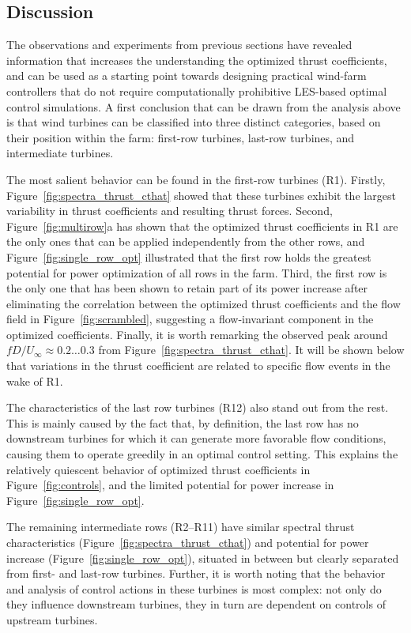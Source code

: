 	\subsection{Discussion}\label{sec:analysis_discussion}
	
	The observations and experiments from previous sections have revealed information that increases the understanding the optimized thrust coefficients, and can be used as a starting point towards designing practical wind-farm controllers that do not require computationally prohibitive LES-based optimal control simulations. A first conclusion that can be drawn from the analysis above is that wind turbines can be classified into three distinct categories, based on their position within the farm: first-row turbines, last-row turbines, and intermediate turbines.
	
	The most salient behavior can be found in the first-row turbines (R1). Firstly, Figure~\ref{fig:spectra_thrust_cthat} showed that these turbines exhibit the largest variability in thrust coefficients and resulting thrust forces. Second, Figure~\ref{fig:multirow}a has shown that the optimized thrust coefficients in R1 are the only ones that can be applied independently from the other rows, and Figure~\ref{fig:single_row_opt} illustrated that the first row holds the greatest potential for power optimization of all rows in the farm. Third, the first row is the only one that has been shown to retain part of its power increase after eliminating the correlation between the optimized thrust coefficients and the flow field in Figure~\ref{fig:scrambled}, suggesting a flow-invariant component in the optimized coefficients. Finally, it is worth remarking the observed peak around $fD/U_\infty \approx 0.2 \dots 0.3$ from Figure~\ref{fig:spectra_thrust_cthat}. It will be shown below that variations in the thrust coefficient are related to specific flow events in the wake of R1.
	
	The characteristics of the last row turbines (R12) also stand out from the rest. This is mainly caused by the fact that, by definition, the last row has no downstream turbines for which it can generate more favorable flow conditions, causing them to operate greedily in an optimal control setting. This explains the relatively quiescent behavior of optimized thrust coefficients in Figure~\ref{fig:controls}, and the limited potential for power increase in Figure~\ref{fig:single_row_opt}. 
	
	The remaining intermediate rows (R2--R11) have similar spectral thrust characteristics (Figure~\ref{fig:spectra_thrust_cthat}) and potential for power increase (Figure~\ref{fig:single_row_opt}), situated in between but clearly separated from first- and last-row turbines. Further, it is worth noting that the behavior and analysis of control actions in these turbines is most complex: not only do they influence downstream turbines, they in turn are dependent on controls of upstream turbines. 
	
